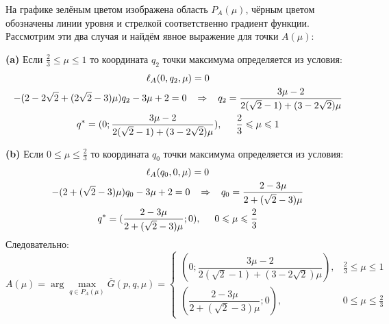 На графике зелёным цветом изображена область $P_A(\mu)$, чёрным цветом
обозначены линии уровня и стрелкой соответственно градиент функции.
Рассмотрим эти два случая и найдём явное выражение для точки $A(\mu)$:

\textbf{(a)}
Если $\frac{2}{3} \leqslant \mu \leqslant 1$ то координата $q_2$ 
точки максимума определяется из условия: 	
\begin{gather*}	
	\ell_A(0,q_2,\mu)=0 
	\\
	-(2-2\sqrt{2}+(2\sqrt{2}-3)\mu)q_2
	-3\mu+2=0
	\hspace{3mm} \Rightarrow \hspace{3mm}
	q_2=\frac{3\mu-2}{2(\sqrt{2}-1)+(3-2\sqrt{2})\mu}	
	\\
	q^*= (0;\dfrac{3\mu-2}{2(\sqrt{2}-1)+(3-2\sqrt{2})\mu}), 
	\hspace{5mm} \frac{2}{3} \leqslant \mu \leqslant 1
\end{gather*}

\textbf{(b)}
Если $0 \leqslant \mu \leqslant \frac{2}{3}$ то координата $q_0$ точки 
максимума определяется из условия: 	
\begin{gather*}
	\ell_A(q_0,0,\mu)=0	
	\\
	-(2+(\sqrt{2}-3)\mu)q_0
	-3\mu+2=0	
	\hspace{3mm} \Rightarrow \hspace{3mm}
	q_0=\frac{2-3\mu}{2+(\sqrt{2}-3)\mu}	
	\\
	q^*= (\dfrac{2-3\mu}{2+(\sqrt{2}-3)\mu};0), 
	\hspace{5mm} 0 \leqslant \mu \leqslant \frac{2}{3}	
\end{gather*}
Следовательно:
\begin{equation} 
	\label{eq:A_point}
	A(\mu) = \arg \max \limits_{q\in P_A(\mu)} \overline G(p,q,\mu) = 
	\begin{cases}
		(0;\dfrac{3\mu-2}{2(\sqrt{2}-1)+(3-2\sqrt{2})\mu}), & 
		\frac{2}{3} \leqslant \mu \leqslant 1 
		\\
		(\dfrac{2-3\mu}{2+(\sqrt{2}-3)\mu};0), & 
		0 \leqslant \mu \leqslant \frac{2}{3}	
	\end{cases}
\end{equation}


